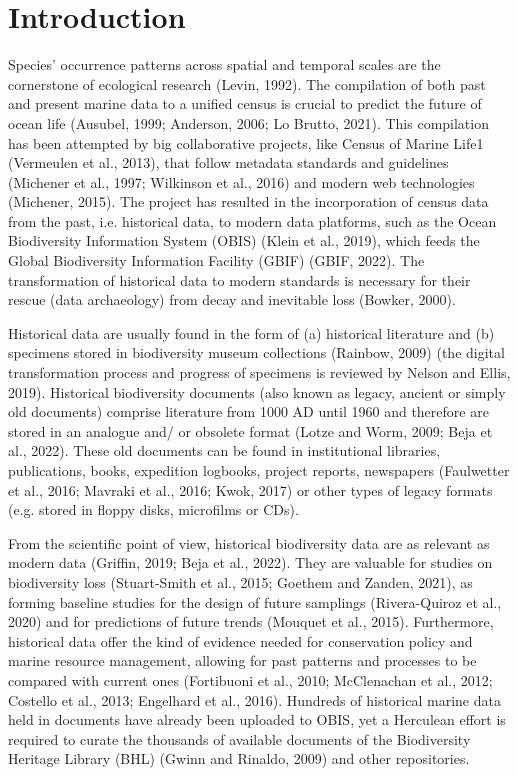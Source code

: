 \section{Introduction}
\label{sec:deco-intro}
Species’ occurrence patterns across spatial and temporal scales are the 
cornerstone of ecological research (Levin, 1992). The compilation of both past 
and present marine data to a unified census is crucial to predict the future of 
ocean life (Ausubel, 1999; Anderson, 2006; Lo Brutto, 2021). This compilation has 
been attempted by big collaborative projects, like Census of Marine Life1 (Vermeulen et al., 2013), 
that follow metadata standards and guidelines (Michener et al., 1997; Wilkinson et al., 2016) 
and modern web technologies (Michener, 2015). The project has resulted in the incorporation 
of census data from the past, i.e. historical data, to modern data platforms, such 
as the Ocean Biodiversity Information System (OBIS) (Klein et al., 2019), which feeds 
the Global Biodiversity Information Facility (GBIF) (GBIF, 2022). The transformation of 
historical data to modern standards is necessary for their rescue (data archaeology)
from decay and inevitable loss (Bowker, 2000).

Historical data are usually found in the form of (a) historical literature and 
(b) specimens stored in biodiversity museum collections (Rainbow, 2009) (the 
digital transformation process and progress of specimens is reviewed by Nelson and Ellis, 2019). 
Historical biodiversity documents (also known as legacy, ancient or simply old 
documents) comprise literature from 1000 AD until 1960 and therefore are stored 
in an analogue and/ or obsolete format (Lotze and Worm, 2009; Beja et al., 2022). 
These old documents can be found in institutional libraries, publications, books, 
expedition logbooks, project reports, newspapers (Faulwetter et al., 2016; Mavraki et al., 2016; Kwok, 2017) 
or other types of legacy formats (e.g. stored in floppy disks, microfilms or CDs).

From the scientific point of view, historical biodiversity data are as relevant 
as modern data (Griffin, 2019; Beja et al., 2022). They are valuable for studies on biodiversity loss (Stuart-Smith et al., 2015; Goethem and Zanden, 2021), as forming baseline studies for the design of future samplings (Rivera-Quiroz et al., 2020) and for predictions of future trends (Mouquet et al., 2015). Furthermore, historical data offer the kind of evidence needed for conservation policy and marine resource management, allowing for past patterns and processes to be compared with current ones (Fortibuoni et al., 2010; McClenachan et al., 2012; Costello et al., 2013; Engelhard et al., 2016). Hundreds of historical marine data held in documents have already been uploaded to OBIS, yet a Herculean effort is required to curate the thousands of available documents of the Biodiversity Heritage Library (BHL) (Gwinn and Rinaldo, 2009) and other repositories.

